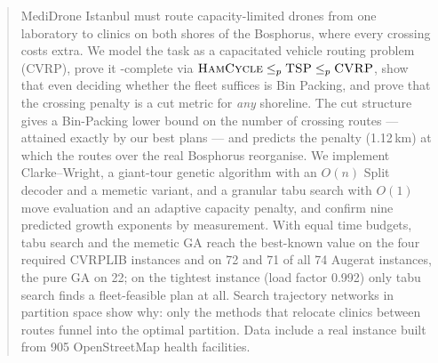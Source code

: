 \begin{abstract}
\noindent MediDrone Istanbul must route capacity-limited drones from one laboratory to clinics on both shores of
the Bosphorus, where every crossing costs extra. We model the task as a capacitated vehicle routing problem
(CVRP), prove it \NP-complete via $\hc\le_p\tsp\le_p\cvrp$, show that even deciding whether the fleet suffices is
Bin Packing, and prove that the crossing penalty is a cut metric for \emph{any} shoreline. The cut structure gives
a Bin-Packing lower bound on the number of crossing routes --- attained exactly by our best plans --- and predicts
the penalty (1.12\,km) at which the routes over the real Bosphorus reorganise. We implement Clarke--Wright, a
giant-tour genetic algorithm with an $O(n)$ Split decoder and a memetic variant, and a granular tabu search with
$O(1)$ move evaluation and an adaptive capacity penalty, and confirm nine predicted growth exponents by
measurement. With equal time budgets, tabu search and the memetic GA reach the best-known value on the four
required CVRPLIB instances and on 72 and 71 of all 74 Augerat instances, the pure GA on 22; on the tightest
instance (load factor 0.992) only tabu search finds a fleet-feasible plan at all. Search trajectory networks in
partition space show why: only the methods that relocate clinics between routes funnel into the optimal partition.
Data include a real instance built from 905 OpenStreetMap health facilities.
\end{abstract}
